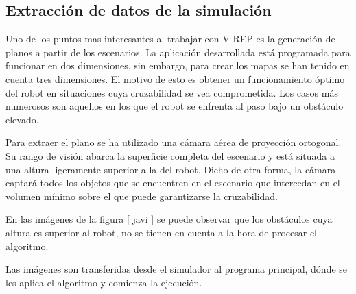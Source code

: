 \subsection{Extracción de datos de la simulación}

Uno de los puntos mas interesantes al trabajar con V-REP es la generación de planos a partir de los escenarios. La aplicación desarrollada está programada para funcionar en dos dimensiones, sin embargo, para crear los mapas se han tenido en cuenta tres dimensiones. El motivo de esto es obtener un funcionamiento óptimo del robot en situaciones cuya cruzabilidad se vea comprometida. Los casos más numerosos son aquellos en los que el robot se enfrenta al paso bajo un obstáculo elevado. 

Para extraer el plano se ha utilizado una cámara aérea de proyección ortogonal. Su rango de visión abarca la superficie completa del escenario y está situada a una altura ligeramente superior a la del robot. Dicho de otra forma, la cámara captará todos los objetos que se encuentren en el escenario que intercedan en el volumen mínimo sobre el que puede garantizarse la cruzabilidad.

En las imágenes de la figura [ javi ] se puede observar que los obstáculos cuya altura es superior al robot, no se tienen en cuenta a la hora de procesar el algoritmo.


Las imágenes son transferidas desde el simulador al programa principal, dónde se les aplica el algoritmo y comienza la ejecución.

